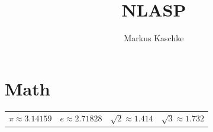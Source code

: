 \documentclass[english]{latex4ei/latex4ei_sheet}
\title{NLASP}
\author{Markus Kaschke}					%
\begin{document}
\ifdefined\GitRevision{}\fi
\maketitle   %

\section{Math}

\begin{sectionbox}
    \begin{tabular}{@{}llll}
        $\pi \approx \num{3,14159}$ & $e \approx \num{2,71828}$ & $\sqrt{2} \approx \num{1,414}$ & $\sqrt{3} \approx \num{1,732}$ \\
    \end{tabular}


\end{sectionbox}
\end{document}
